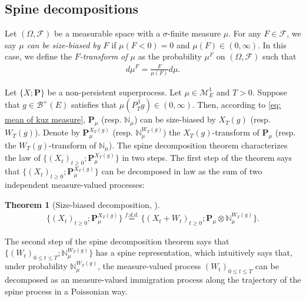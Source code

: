 \documentclass[12pt,a4paper]{amsart}
\newtheorem{thm}{Theorem}[section]
\theoremstyle{definition}
\numberwithin{equation}{section}
\begin{document}
\subsection{Spine decompositions}
\label{sec: Spine decompositions}
Let $(\Omega, \mathscr F)$ be a measurable space with a $\sigma$-finite measure $\mu$.
For any $F\in \mathscr F$, we say \emph{$\mu$ can be size-biased by $F$} if $\mu(F< 0) = 0$ and $\mu(F) \in (0,\infty)$.
In this case, we define the \emph{$F$-transform of $\mu$} as the probability $\mu^F$ on $(\Omega, \mathscr F)$ such that
\begin{align}	
	d\mu^F
	= \frac{F}{\mu(F)}d \mu.
\end{align}

Let $\{X;\mathbf P\}$ be a non-persistent superprocess.
Let $\mu \in \mathcal M^1_E$ and $T>0$.
Suppose that $g\in \mathscr B^+(E)$ satisfies that $\mu(P^\beta_Tg) \in (0,\infty)$.
Then, according to \eqref{eq: mean of kuz measure}, $\mathbf P_\mu$ (resp. $\mathbb N_\mu$) can be size-biased by $X_T(g)$ (resp. $W_T(g)$).
Denote by $\mathbf P_\mu^{X_T(g)}$ (resp. $\mathbb N^{W_T(g)}_\mu$) the $X_T(g)$-transform of $\mathbf P_\mu$ (resp. the $W_T(g)$-transform of $\mathbb N_\mu$).
The spine decomposition theorem characterizes the law of $\{(X_t)_{t\geq 0}; \mathbf P_\mu^{X_T(g)}\}$ in two steps.
The first step of the theorem says that $\{(X_t)_{t\geq 0}; \mathbf P_\mu^{X_T(g)}\}$ can be decomposed in law as the sum of two independent measure-valued processes:
	
\begin{thm}[Size-biased decomposition,  \cite{RenSongSun2017Spine}]\label{thm: size-biased decomposition}
  \begin{align}
    \{(X_t)_{t\geq 0}; \mathbf P_\mu^{X_T(g)}\}
    \overset{f.d.d.}{=} \{(X_t+W_t)_{t\geq 0}; \mathbf P_\mu  \otimes \mathbb N^{W_T(g)}_\mu\}.
  \end{align}
\end{thm}
The second step of the spine decomposition theorem says that $\{(W_t)_{0\leq t\leq T}; \mathbb N^{W_T(g)}_\mu\}$ has a spine representation, which intuitively says that, under probability $\mathbb N_\mu^{W_T(g)}$, the measure-valued process $(W_t)_{0\leq t\leq T}$ can be decomposed as an measure-valued immigration process along the trajectory of the spine process in a Poissonian way.
\end{document}
